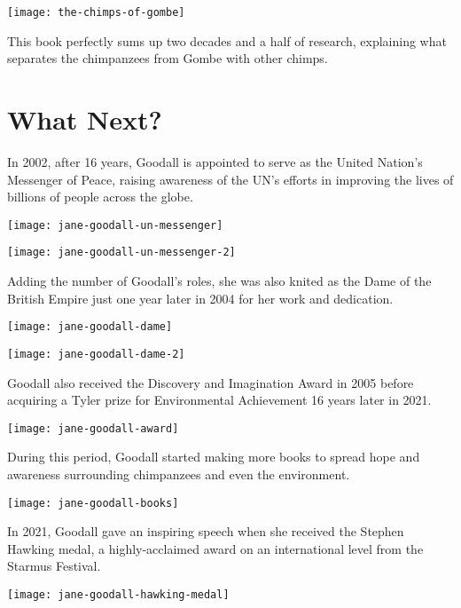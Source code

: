 \documentclass[12pt]{report}
\begin{document}
\texttt{[image: the-chimps-of-gombe]}

This book perfectly sums up two decades and a half of research, explaining what
separates the chimpanzees from Gombe with other chimps.

\pagebreak

\section*{What Next?}

In 2002, after 16 years, Goodall is appointed to serve as the United Nation's
Messenger of Peace, raising awareness of the UN's efforts in improving the
lives of billions of people across the globe.

\texttt{[image: jane-goodall-un-messenger]}

\texttt{[image: jane-goodall-un-messenger-2]}

\pagebreak

Adding the number of Goodall's roles, she was also knited as the Dame of the
British Empire just one year later in 2004 for her work and dedication.

\texttt{[image: jane-goodall-dame]}

\texttt{[image: jane-goodall-dame-2]}

\pagebreak

Goodall also received the Discovery and Imagination Award in 2005 before
acquiring a Tyler prize for Environmental Achievement 16 years later in 2021.

\texttt{[image: jane-goodall-award]}

During this period, Goodall started making more books to spread hope and
awareness surrounding chimpanzees and even the environment.

\texttt{[image: jane-goodall-books]}

\pagebreak

In 2021, Goodall gave an inspiring speech when she received the Stephen Hawking
medal, a highly-acclaimed award on an international level from the Starmus
Festival.

\texttt{[image: jane-goodall-hawking-medal]}
\end{document}
